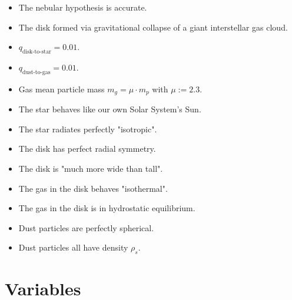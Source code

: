     \begin{itemize}
        \item The nebular hypothesis is accurate. 
        \item The disk formed via gravitational collapse of a giant interstellar gas cloud.
        \item $q_\text{disk-to-star}=0.01$.
        \item $q_\text{dust-to-gas}=0.01$.
        \item Gas mean particle mass $m_g=\mu\cdot m_p$ with $\mu:=2.3$.
        \item The star behaves like our own Solar System's Sun.
        \item The star radiates perfectly "isotropic".
        \item The disk has perfect radial symmetry.
        \item The disk is "much more wide than tall".
        \item The gas in the disk behaves "isothermal".
        \item The gas in the disk is in hydrostatic equilibrium.
        \item Dust particles are perfectly spherical.
        \item Dust particles all have density $\rho_s$.
    \end{itemize}

\clearpage
\section{Variables}

